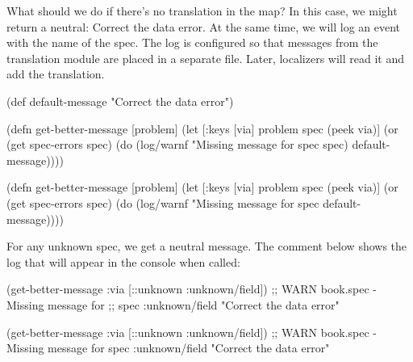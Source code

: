 What should we do if there's no translation in the map? In this case, we might return a neutral: Correct the data error. At the same time, we will log an event with the name of the spec. The log is configured so that messages from the translation module are placed in a separate file. Later, localizers will read it and add the translation.

  \begin{clojure}
(def default-message
  "Correct the data error")
  \end{clojure}

\ifx\DEVICETYPE\MOBILE

\begin{english}
  \begin{clojure}
(defn get-better-message [problem]
  (let [{:keys [via]} problem
        spec (peek via)]
    (or (get spec-errors spec)
        (do
          (log/warnf
            "Missing message for spec %
            spec)
          default-message))))
  \end{clojure}
\end{english}

\else

\begin{english}
  \begin{clojure}
(defn get-better-message [problem]
  (let [{:keys [via]} problem
        spec (peek via)]
    (or (get spec-errors spec)
        (do (log/warnf "Missing message for spec %
            default-message))))
  \end{clojure}
\end{english}

\fi

\noindent
For any unknown spec, we get a neutral message. The comment below shows the log that will appear in the console when called:

\ifx\DEVICETYPE\MOBILE

  \begin{clojure}
(get-better-message
    {:via [::unknown :unknown/field]})
;; WARN book.spec - Missing message for
;; spec :unknown/field
"Correct the data error"
  \end{clojure}

\else

  \begin{clojure}
(get-better-message {:via [::unknown :unknown/field]})
;; WARN book.spec - Missing message for spec :unknown/field
"Correct the data error"
  \end{clojure}

